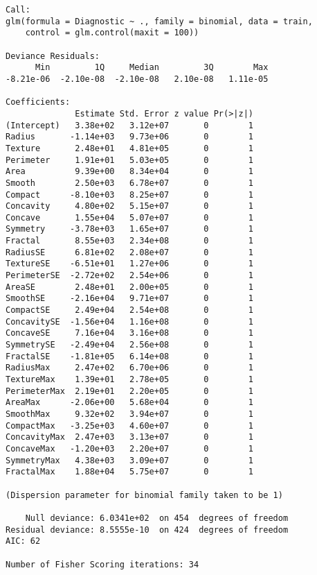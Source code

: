 \documentclass{paper}
\begin{document}
\begin{minipage}{\linewidth}
  \begin{lstlisting}[caption={Summary of the logistic regression model.},
    label=list:res2]
Call:
glm(formula = Diagnostic ~ ., family = binomial, data = train, 
    control = glm.control(maxit = 100))

Deviance Residuals: 
      Min         1Q     Median         3Q        Max  
-8.21e-06  -2.10e-08  -2.10e-08   2.10e-08   1.11e-05  

Coefficients:
              Estimate Std. Error z value Pr(>|z|)
(Intercept)   3.38e+02   3.12e+07       0        1
Radius       -1.14e+03   9.73e+06       0        1
Texture       2.48e+01   4.81e+05       0        1
Perimeter     1.91e+01   5.03e+05       0        1
Area          9.39e+00   8.34e+04       0        1
Smooth        2.50e+03   6.78e+07       0        1
Compact      -8.10e+03   8.25e+07       0        1
Concavity     4.80e+02   5.15e+07       0        1
Concave       1.55e+04   5.07e+07       0        1
Symmetry     -3.78e+03   1.65e+07       0        1
Fractal       8.55e+03   2.34e+08       0        1
RadiusSE      6.81e+02   2.08e+07       0        1
TextureSE    -6.51e+01   1.27e+06       0        1
PerimeterSE  -2.72e+02   2.54e+06       0        1
AreaSE        2.48e+01   2.00e+05       0        1
SmoothSE     -2.16e+04   9.71e+07       0        1
CompactSE     2.49e+04   2.54e+08       0        1
ConcavitySE  -1.56e+04   1.16e+08       0        1
ConcaveSE     7.16e+04   3.16e+08       0        1
SymmetrySE   -2.49e+04   2.56e+08       0        1
FractalSE    -1.81e+05   6.14e+08       0        1
RadiusMax     2.47e+02   6.70e+06       0        1
TextureMax    1.39e+01   2.78e+05       0        1
PerimeterMax  2.19e+01   2.20e+05       0        1
AreaMax      -2.06e+00   5.68e+04       0        1
SmoothMax     9.32e+02   3.94e+07       0        1
CompactMax   -3.25e+03   4.60e+07       0        1
ConcavityMax  2.47e+03   3.13e+07       0        1
ConcaveMax   -1.20e+03   2.20e+07       0        1
SymmetryMax   4.38e+03   3.09e+07       0        1
FractalMax    1.88e+04   5.75e+07       0        1

(Dispersion parameter for binomial family taken to be 1)

    Null deviance: 6.0341e+02  on 454  degrees of freedom
Residual deviance: 8.5555e-10  on 424  degrees of freedom
AIC: 62

Number of Fisher Scoring iterations: 34
  \end{lstlisting}
\end{minipage}
\end{document}

